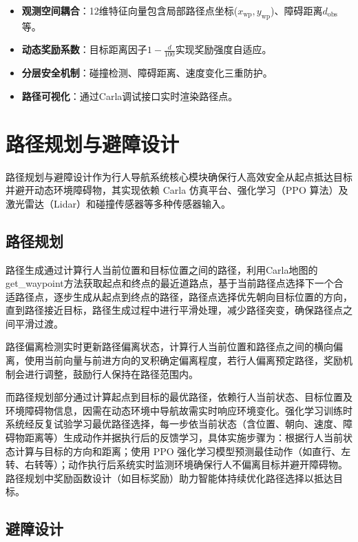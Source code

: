 	\begin{itemize}
	    \item \textbf{观测空间耦合}：12维特征向量包含局部路径点坐标($x_{\text{wp}}, y_{\text{wp}}$)、障碍距离$d_{\text{obs}}$等。
	    \item \textbf{动态奖励系数}：目标距离因子$1 - \frac{d}{100}$实现奖励强度自适应。
	    \item \textbf{分层安全机制}：碰撞检测、障碍距离、速度变化三重防护。
	    \item \textbf{路径可视化}：通过Carla调试接口实时渲染路径点。
	\end{itemize}
	
	\section{路径规划与避障设计}
	
	路径规划与避障设计作为行人导航系统核心模块确保行人高效安全从起点抵达目标并避开动态环境障碍物，其实现依赖 Carla 仿真平台、强化学习（PPO 算法）及激光雷达（Lidar）和碰撞传感器等多种传感器输入。
	
	\subsection{路径规划}
	
	路径生成通过计算行人当前位置和目标位置之间的路径，利用Carla地图的get\_waypoint方法获取起点和终点的最近道路点，基于当前路径点选择下一个合适路径点，逐步生成从起点到终点的路径，路径点选择优先朝向目标位置的方向，直到路径接近目标，路径生成过程中进行平滑处理，减少路径突变，确保路径点之间平滑过渡。
	
	路径偏离检测实时更新路径偏离状态，计算行人当前位置和路径点之间的横向偏离，使用当前向量与前进方向的叉积确定偏离程度，若行人偏离预定路径，奖励机制会进行调整，鼓励行人保持在路径范围内。
	
	而路径规划部分通过计算起点到目标的最优路径，依赖行人当前状态、目标位置及环境障碍物信息，因需在动态环境中导航故需实时响应环境变化。强化学习训练时系统经反复试验学习最优路径选择，每一步依当前状态（含位置、朝向、速度、障碍物距离等）生成动作并据执行后的反馈学习，具体实施步骤为：根据行人当前状态计算与目标的方向和距离；使用 PPO 强化学习模型预测最佳动作（如直行、左转、右转等）；动作执行后系统实时监测环境确保行人不偏离目标并避开障碍物。路径规划中奖励函数设计（如目标奖励）助力智能体持续优化路径选择以抵达目标。
	
	\subsection{避障设计}
	
